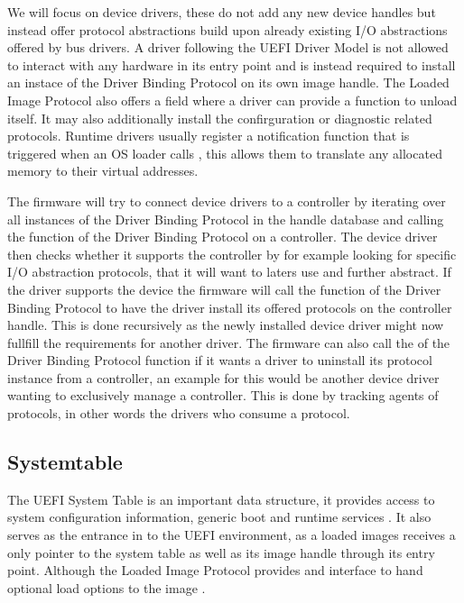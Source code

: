 We will focus on device drivers, these do not add any new device handles but instead offer protocol abstractions build upon already existing \ac{I/O} abstractions offered by bus drivers.
A driver following the \ac{UEFI} Driver Model is not allowed to interact with any hardware in its entry point and is instead required to install an instace of the Driver Binding Protocol on its own image handle.
The Loaded Image Protocol also offers a field where a driver can provide a function to unload itself.
It may also additionally install the confirguration or diagnostic related protocols.
Runtime drivers usually register a notification function that is triggered when an \ac{OS} loader calls , this allows them to translate any allocated memory to their virtual addresses.

The firmware will try to connect device drivers to a controller by iterating over all instances of the Driver Binding Protocol in the handle database and calling the  function of the Driver Binding Protocol on a controller. The device driver then checks whether it supports the controller by for example looking for specific \ac{I/O} abstraction protocols, that it will want to laters use and further abstract.
If the driver supports the device the firmware will call the  function of the Driver Binding Protocol to have the driver install its offered protocols on the controller handle.
This is done recursively as the newly installed device driver might now fullfill the requirements for another driver.
The firmware can also call the  of the Driver Binding Protocol function if it wants a driver to uninstall its protocol instance from a controller, an example for this would be another device driver wanting to exclusively manage a controller. This is done by tracking agents of protocols, in other words the drivers who consume a protocol.

\subsection{Systemtable}

The UEFI System Table is an important data structure, it provides access to system configuration information, generic boot and runtime services \cite[Section 3.3]{tianocore-edk2-driver-writer-s-guide}.
It also serves as the entrance in to the \ac{UEFI} environment, as a loaded images receives a only pointer to the system table as well as its image handle through its entry point. Although the Loaded Image Protocol provides and interface to hand optional load options to the image \cite{beyond-bios}.

